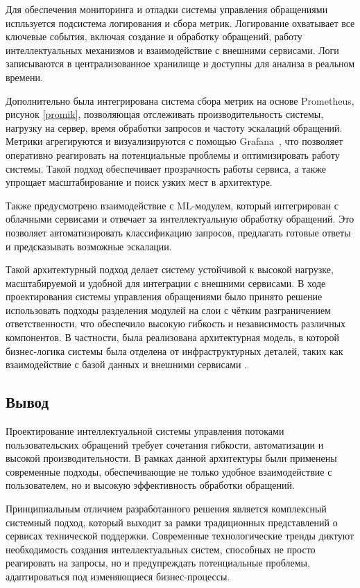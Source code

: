 Для обеспечения мониторинга и отладки системы управления обращениями испльзуется подсистема логирования и сбора метрик. Логирование охватывает все ключевые события, включая создание и обработку обращений, работу интеллектуальных механизмов и взаимодействие с внешними сервисами. Логи записываются в централизованное хранилище и доступны для анализа в реальном времени.


Дополнительно была интегрирована система сбора метрик на основе Prometheus, рисунок \ref{promik}, позволяющая отслеживать производительность системы, нагрузку на сервер, время обработки запросов и частоту эскалаций обращений. Метрики агрегируются и визуализируются с помощью Grafana~\cite{Grafana}, что позволяет оперативно реагировать на потенциальные проблемы и оптимизировать работу системы. Такой подход обеспечивает прозрачность работы сервиса, а также упрощает масштабирование и поиск узких мест в архитектуре.

Также предусмотрено взаимодействие с ML-модулем, который интегрирован с облачными сервисами и отвечает за интеллектуальную обработку обращений. Это позволяет автоматизировать классификацию запросов, предлагать готовые ответы и предсказывать возможные эскалации.

Такой архитектурный подход делает систему устойчивой к высокой нагрузке, масштабируемой и удобной для интеграции с внешними сервисами. В ходе проектирования системы управления обращениями было принято решение использовать подходы разделения модулей на слои с чётким разграничением ответственности, что обеспечило высокую гибкость и независимость различных компонентов. В частности, была реализована архитектурная модель, в которой бизнес-логика системы была отделена от инфраструктурных деталей, таких как взаимодействие с базой данных и внешними сервисами \cite{Martin2017}.

\subsection{Вывод}

Проектирование интеллектуальной системы управления потоками пользовательских обращений требует сочетания гибкости, автоматизации и высокой производительности. В рамках данной архитектуры были применены современные подходы, обеспечивающие не только удобное взаимодействие с пользователем, но и высокую эффективность обработки обращений.

Принципиальным отличием разработанного решения является комплексный системный подход, который выходит за рамки традиционных представлений о сервисах технической поддержки. Современные технологические тренды диктуют необходимость создания интеллектуальных систем, способных не просто реагировать на запросы, но и предупреждать потенциальные проблемы, адаптироваться под изменяющиеся бизнес-процессы.

